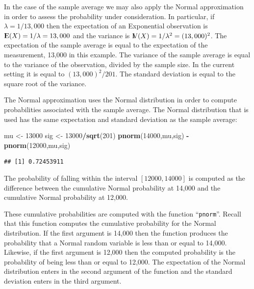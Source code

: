 \documentclass[]{krantz}
\makeatletter
\newenvironment{Shaded}{\begin{snugshade}}{\end{snugshade}}
\newcommand{\DecValTok}[1]{\textcolor[rgb]{0.00,0.00,0.81}{#1}}
\newcommand{\KeywordTok}[1]{\textcolor[rgb]{0.13,0.29,0.53}{\textbf{#1}}}
\newcommand{\NormalTok}[1]{#1}
\newcommand{\OperatorTok}[1]{\textcolor[rgb]{0.81,0.36,0.00}{\textbf{#1}}}
\newcommand{\StringTok}[1]{\textcolor[rgb]{0.31,0.60,0.02}{#1}}
\newcommand{\Expec}{{\rm I\kern-.3em E}}
\newcommand{\Var}{{\rm I\kern-.3em V}}
\newenvironment{kframe}{%
\medskip{}
\setlength{\fboxsep}{.8em}
 \def\at@end@of@kframe{}%
 \ifinner\ifhmode%
  \def\at@end@of@kframe{\end{minipage}}%
  \begin{minipage}{\columnwidth}%
 \fi\fi%
 \def\FrameCommand##1{\hskip\@totalleftmargin \hskip-\fboxsep
 \colorbox{shadecolor}{##1}\hskip-\fboxsep
     \hskip-\linewidth \hskip-\@totalleftmargin \hskip\columnwidth}%
 \MakeFramed {\advance\hsize-\width
   \@totalleftmargin\z@ \linewidth\hsize
   \@setminipage}}%
 {\par\unskip\endMakeFramed%
 \at@end@of@kframe}
\renewenvironment{Shaded}{\begin{kframe}}{\end{kframe}}
\theoremstyle{definition}
\theoremstyle{definition}
\theoremstyle{definition}
\theoremstyle{remark}
\makeatother
\begin{document}
In the case of the sample average we may also apply the Normal
approximation in order to assess the probability under consideration. In
particular, if \(\lambda = 1/13,000\) then the expectation of an
Exponential observation is \(\Expec(X) = 1/\lambda = 13,000\) and the
variance is \(\Var(X) = 1/\lambda^2 = (13,000)^2\). The expectation of the
sample average is equal to the expectation of the measurement, 13,000 in
this example. The variance of the sample average is equal to the
variance of the observation, divided by the sample size. In the current
setting it is equal to \((13,000)^2/201\). The standard deviation is equal
to the square root of the variance.

The Normal approximation uses the Normal distribution in order to
compute probabilities associated with the sample average. The Normal
distribution that is used has the same expectation and standard
deviation as the sample average:

\begin{Shaded}
\begin{Highlighting}[]
\NormalTok{mu <-}\StringTok{ }\DecValTok{13000}
\NormalTok{sig <-}\StringTok{ }\DecValTok{13000}\OperatorTok{/}\KeywordTok{sqrt}\NormalTok{(}\DecValTok{201}\NormalTok{)}
\KeywordTok{pnorm}\NormalTok{(}\DecValTok{14000}\NormalTok{,mu,sig) }\OperatorTok{-}\StringTok{ }\KeywordTok{pnorm}\NormalTok{(}\DecValTok{12000}\NormalTok{,mu,sig)}
\end{Highlighting}
\end{Shaded}

\begin{verbatim}
## [1] 0.72453911
\end{verbatim}

The probability of falling within the interval \([12000, 14000]\) is
computed as the difference between the cumulative Normal probability at
14,000 and the cumulative Normal probability at 12,000.

These cumulative probabilities are computed with the function ``\texttt{pnorm}''.
Recall that this function computes the cumulative probability for the
Normal distribution. If the first argument is 14,000 then the function
produces the probability that a Normal random variable is less than or
equal to 14,000. Likewise, if the first argument is 12,000 then the
computed probability is the probability of being less than or equal to
12,000. The expectation of the Normal distribution enters in the second
argument of the function and the standard deviation enters in the third
argument.
\end{document}
